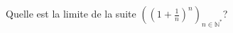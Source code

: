   Quelle est la limite de la suite $((1+\frac{1}{n})^{n})_{n\in  \mathbb{N}^{*}}$? \bigskip \bigskip
